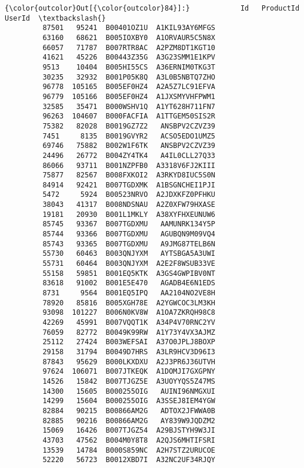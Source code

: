 \documentclass[11pt]{article}
\begin{document}
\begin{Verbatim}[commandchars=\\\{\}]
{\color{outcolor}Out[{\color{outcolor}84}]:}            Id   ProductId          UserId  \textbackslash{}
         87501   95241  B00401OZ1U  A1KIL93AY6MFGS   
         63160   68621  B005IOXBY0  A1ORVAUR5C5N8X   
         66057   71787  B007RTR8AC  A2PZM8DT1KGT10   
         41621   45226  B00443Z35G  A3G23SMM1E1KPV   
         9513    10404  B005HI55CS  A36ERNIM0TKG3T   
         30235   32932  B001P05K8Q  A3L0B5NBTQ7ZHO   
         96778  105165  B005EF0HZ4  A2A5Z7LC91EFVA   
         96779  105166  B005EF0HZ4  A1JXSMYVHFPWM1   
         32585   35471  B000WSHV1Q  A1YT628H711FN7   
         96263  104607  B000FACFIA  A1TTGEM50SIS2R   
         75382   82028  B0019GZ7Z2   ANSBPV2CZVZ39   
         7451     8135  B0019GVYR2   ACSO5EDO1UMZ5   
         69746   75882  B002W1F6TK   ANSBPV2CZVZ39   
         24496   26772  B004ZY4TK4   A4IL0CLL27Q33   
         86066   93711  B001NZPFB0  A3318V6FJ2KIII   
         75877   82567  B008FXKOI2  A3RKYD8IUC5S0N   
         84914   92421  B007TGDXMK  A1BSGNCHEI1PJI   
         5472     5924  B00523NRVO  A2JDXKFZ0PFHKU   
         38043   41317  B008NDSNAU  A2Z0XFW79HXASE   
         19181   20930  B001L1MKLY  A38XYFHXEUNUW6   
         85745   93367  B007TGDXMU   AAMUNRK134Y5P   
         85744   93366  B007TGDXMU   AGUBQN9M09VQ4   
         85743   93365  B007TGDXMU   A9JMG87TELB6N   
         55730   60463  B003QNJYXM   AYTSBGA5A3UWI   
         55731   60464  B003QNJYXM  A2E2F8WSUB33VE   
         55158   59851  B001EQ5KTK  A3GS4GWPIBV0NT   
         83618   91002  B001E5E470   AGADB4E6N1EDS   
         8731     9564  B001EQ5IPQ   AA2104NO2VE8H   
         78920   85816  B005XGH78E  A2YGWCOC3LM3KH   
         93098  101227  B006N0KV8W  A1OA7ZKRQH98C8   
         42269   45991  B007VQQT1K  A34P4V70RNC2YV   
         76059   82772  B0049K99RW  A1Y73Y4VX3AJMZ   
         25112   27424  B003WEFSAI  A37O0JPLJ8BOXP   
         29158   31794  B0049D7HRS  A3LR9HCV3D96I3   
         87843   95629  B000LKXDXU  A2J3PR6J36UTVH   
         97624  106071  B007JTKEQK  A1DOMJI7GXGPNY   
         14526   15842  B007TJGZ5E  A3UOYYQS5Z47MS   
         14300   15605  B000255OIG   AUINI96NMGXUI   
         14299   15604  B000255OIG  A3SSEJ8IEM4YGW   
         82884   90215  B00866AM2G   ADTOX2JFWWA0B   
         82885   90216  B00866AM2G   AY839W9JQDZM2   
         15069   16426  B007TJGZ54  A29BJSTYH9W3JI   
         43703   47562  B004M0Y8T8  A2QJS6MHTIFSRI   
         13539   14784  B000S859NC  A2H7STZ2URUCOE   
         52220   56723  B0012XBD7I  A32NC2UF34RJQY   

\end{Verbatim}
\end{document}
